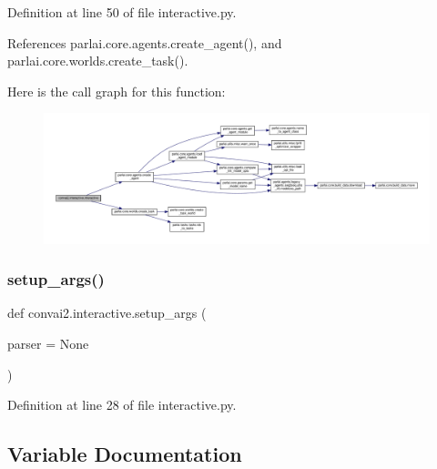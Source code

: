 Definition at line 50 of file interactive.\+py.



References parlai.\+core.\+agents.\+create\+\_\+agent(), and parlai.\+core.\+worlds.\+create\+\_\+task().

Here is the call graph for this function\+:
\nopagebreak
\begin{figure}[H]
\begin{center}
\leavevmode
\includegraphics[width=350pt]{namespaceconvai2_1_1interactive_a47ad778728ed55d570bc4b8dd426e884_cgraph}
\end{center}
\end{figure}
\mbox{\label{namespaceconvai2_1_1interactive_a67e317db1e41e25d73827a1dd68ff78a}} 
\subsubsection{\texorpdfstring{setup\+\_\+args()}{setup\_args()}}
{\footnotesize\ttfamily def convai2.\+interactive.\+setup\+\_\+args (\begin{DoxyParamCaption}\item[{}]{parser = {\ttfamily None} }\end{DoxyParamCaption})}



Definition at line 28 of file interactive.\+py.



\subsection{Variable Documentation}
\mbox{\label{namespaceconvai2_1_1interactive_a5c8eb6044e72ecf82ce6cc44554c08e5}} 

